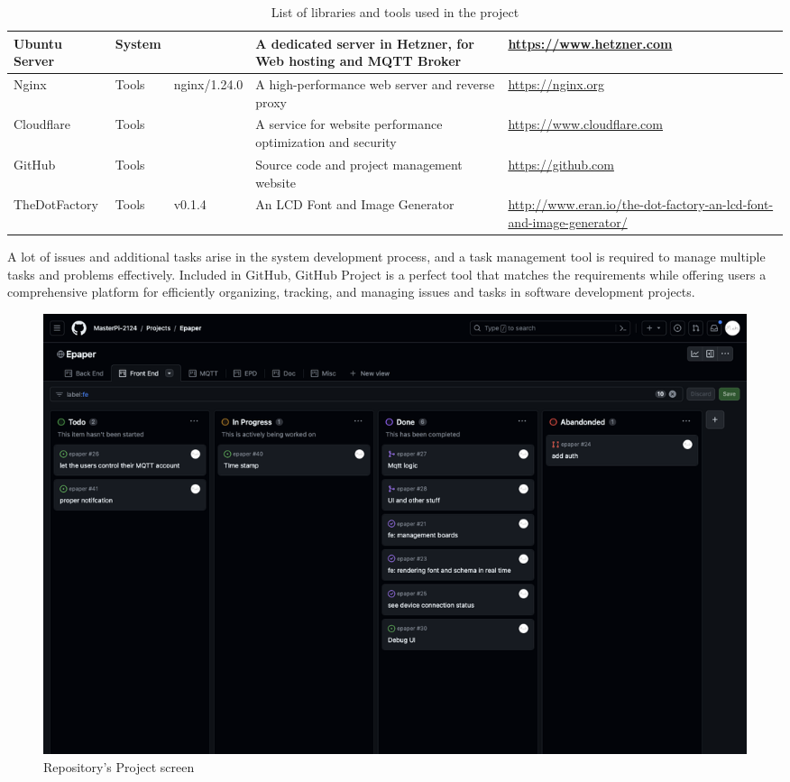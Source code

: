 \documentclass[../Main.tex]{subfiles}
\begin{document}
\begin{table}[H]
\begin{tabular}{| m{3cm} | m{1cm} | m{1.4cm} | m{4cm} | m{4cm} |}
        Ubuntu Server                           & System        &                   & A dedicated server in Hetzner, for Web hosting and MQTT Broker    & \url{https://www.hetzner.com}                                     \\ \hline
        Nginx                                   & Tools         & nginx/1.24.0      & A high-performance web server and reverse proxy                   & \url{https://nginx.org}                                           \\ \hline
        Cloudflare                              & Tools         &                   & A service for website performance optimization and security       & \url{https://www.cloudflare.com}                                  \\ \hline
        GitHub                                  & Tools         &                   & Source code and project management website                        & \url{https://github.com}                      \\ \hline
        TheDotFactory                           & Tools         & v0.1.4            & An LCD Font and Image Generator                                   & \url{http://www.eran.io/the-dot-factory-an-lcd-font-and-image-generator/}                      \\ \hline
    \end{tabular}
    \caption{List of libraries and tools used in the project}
    \label{fig:table_tools}
\end{table}

A lot of issues and additional tasks arise in the system development process, and a task management tool is required to manage multiple tasks and problems effectively. Included in GitHub, GitHub Project is a perfect tool that matches the requirements while offering users a comprehensive platform for efficiently organizing, tracking, and managing issues and tasks in software development projects.
\begin{figure}[H]
    \centering
    \includegraphics[width=0.8\linewidth]{doc//imgs/github-projects.png}
    \caption{Repository's Project screen}
    \label{fig:enter-label}
\end{figure}
\end{document}
